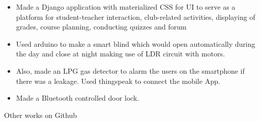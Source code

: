 \documentclass[10pt,a4paper]{altacv}
\begin{document}





\begin{itemize}
  \item Made a Django application with materialized CSS for UI to serve as a platform for student-teacher interaction, club-related activities, displaying of grades, course planning, conducting quizzes and forum
\end{itemize}
\medskip






\begin{itemize}
  \item Used arduino to make a smart blind which would open automatically during the day and close at night making use of LDR circuit with motors. 
  \item Also, made an LPG gas detector to alarm the users on the smartphone if there was a leakage. Used thingspeak to connect the mobile App.
  \item Made a Bluetooth controlled door lock. 
\end{itemize}
\medskip
Other works on Github
\end{document}

